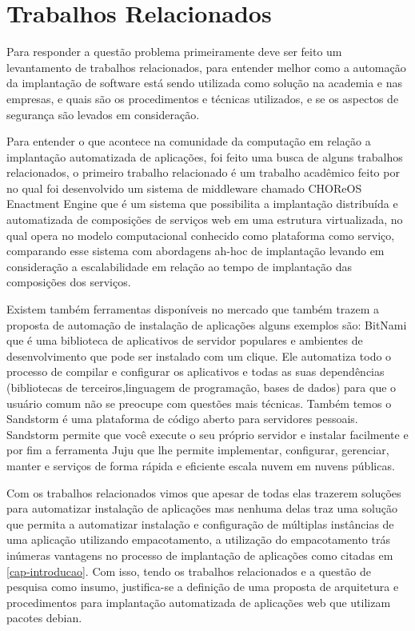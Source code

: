 \section{Trabalhos Relacionados}

Para responder a questão problema primeiramente deve ser feito um levantamento
de trabalhos relacionados, para entender melhor como a automação da implantação
de software está sendo utilizada como solução na academia e nas empresas, e
quais são os procedimentos e técnicas utilizados, e se os aspectos de segurança
são levados em consideração.

Para entender o que acontece na comunidade da computação em relação a implantação
automatizada de aplicações, foi feito uma busca de alguns trabalhos relacionados, o primeiro
trabalho relacionado é um trabalho acadêmico feito por \cite{leo2014} no qual foi
desenvolvido um sistema de middleware chamado CHOReOS Enactment Engine que é um
sistema que possibilita a implantação distribuída e automatizada de composições
de serviços web em uma estrutura virtualizada, no qual opera no modelo
computacional conhecido como plataforma como serviço, comparando esse sistema
com abordagens ah-hoc de implantação levando em consideração a escalabilidade
em relação ao tempo de implantação das composições dos serviços.

Existem também ferramentas disponíveis no mercado que também trazem a proposta
de automação de instalação de aplicações alguns exemplos são: \cite{bitnami}
BitNami que é uma biblioteca de aplicativos de servidor populares e ambientes de
desenvolvimento que pode ser instalado com um clique. Ele automatiza todo o
processo de  compilar e configurar os aplicativos e todas as suas dependências
(bibliotecas de terceiros,linguagem de programação, bases de dados) para que o
usuário comum não se preocupe com questões mais técnicas. Também temos o
\cite{standstormio} Sandstorm é uma plataforma de código aberto para servidores
pessoais. Sandstorm permite que você execute o seu próprio servidor e instalar
facilmente e por fim a ferramenta \cite{juju} Juju que lhe permite implementar,
configurar, gerenciar, manter e serviços de forma rápida e eficiente escala nuvem
em nuvens públicas.

Com os trabalhos relacionados vimos que apesar de todas elas trazerem soluções
para automatizar instalação de aplicações mas nenhuma delas traz uma solução que
permita a automatizar instalação e configuração de múltiplas instâncias de uma aplicação
utilizando empacotamento, a utilização do empacotamento trás inúmeras vantagens
no processo de implantação de aplicações como citadas em \ref{cap-introducao}.
Com isso, tendo os trabalhos relacionados e a questão de pesquisa como insumo,
justifica-se a definição de uma proposta de arquitetura e procedimentos para
implantação automatizada de aplicações web que utilizam pacotes debian.


